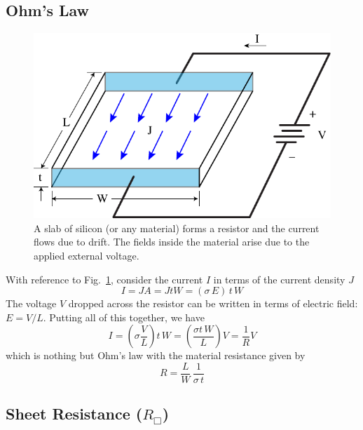 \subsection{Ohm’s Law}


\begin{figure}[tb]
\begin{center}
\includegraphics[width=.5\columnwidth]{ohms_law_slab}
\end{center}
\caption{A slab of silicon (or any material) forms a resistor and the current flows due to drift.  The fields inside the material arise due to the applied external voltage.} \label{fig:ohms_law_slab}
\end{figure}

With reference to Fig.~\ref{fig:ohms_law_slab}, consider the current $I$ in terms of the current density $J$
\begin{equation}
 I = JA = JtW = (\sigma \,E) \,t\,W
\end{equation}   
The voltage $V$ dropped across the resistor can be written in terms of electric field:  $E = V/L$.  Putting all of this together, we have
%
\begin{equation} 
	I =  \left( \sigma\frac{V}{L} \right) t\,W = \left( \frac{\sigma t\,W} {L} \right)  V= \frac{1}{R} V
\end{equation}
which is nothing but Ohm's law with the material resistance given by
\begin{equation} 
	R = \frac{L}{W}\,\frac{1}{{\sigma \,t}} 
\end{equation}
 


\subsection{Sheet Resistance ($R_{\Box}$)} \label{sec:sheetR}

